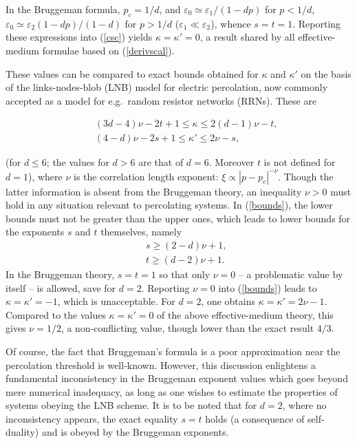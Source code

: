 In the Bruggeman formula, $p_c=1/d$, and $\varepsilon_0
\simeq\varepsilon_1/(1-dp)$ for $p<1/d$, $\varepsilon_0
\simeq\varepsilon_2(1-dp)/(1-d)$ for $p>1/d$
($\varepsilon_1\ll \varepsilon_2$), whence $s=t=1$.
Reporting these expressions into (\ref{csc}) yields
$\kappa=\kappa'=0$, a result shared by all
effective-medium formulae based on (\ref{derivscal}).

These values can be compared to exact bounds obtained
for $\kappa$ and $\kappa'$ on the basis of the
links-nodes-blob (LNB) model for electric percolation,
now commonly accepted as a model for e.g.\ random
resistor networks (RRNs). These are \cite{WRIG86}
\begin{mathletters}
\label{bounds}
\begin{eqnarray}
&&(3d-4)\nu-2t+1\le \kappa\le 2(d-1)\nu-t,\\
&&(4-d)\nu-2s+1\le\kappa'\le 2\nu-s,
\end{eqnarray}
\end{mathletters}
(for $d\le 6$; the values for $d>6$ are that of $d=6$.
Moreover $t$ is not defined for $d=1$), where $\nu$ is
the correlation length exponent: $\xi\propto |p-p_c|^{-\nu}$.
Though the latter information is absent from the Bruggeman
theory, an inequality $\nu>0$ must hold in any situation
relevant to percolating systems. In (\ref{bounds}), the
lower bounds must not be greater than the upper ones,
which leads to lower bounds for the exponents $s$ and
$t$ themselves, namely
\begin{eqnarray}
&&s\ge (2-d)\nu+1,\\
&&t\ge (d-2)\nu+1.
\end{eqnarray}
In the Bruggeman theory, $s=t=1$ so that only $\nu=0$
-- a problematic value by itself -- is allowed, save for
$d=2$. Reporting $\nu=0$ into (\ref{bounds}) leads to
$\kappa=\kappa'=-1$, which is unacceptable. For $d=2$,
one obtains $\kappa=\kappa'=2\nu-1$. Compared to the
values $\kappa=\kappa'=0$ of the above effective-medium
theory, this gives $\nu=1/2$, a non-conflicting value,
though lower than the exact result $4/3$.

Of course, the fact that Bruggeman's formula is a poor
approximation near the percolation threshold is well-known.
However, this discussion enlightens a fundamental
inconsistency in the Bruggeman exponent values which
goes beyond mere numerical inadequacy, as long as one 
wishes to estimate the properties of systems obeying
the LNB scheme. It is to be noted that for $d=2$, where 
no inconsistency appears, the exact equality $s=t$ holds
(a consequence of self-duality) \cite{STRA77} and is obeyed
by the Bruggeman exponents.

